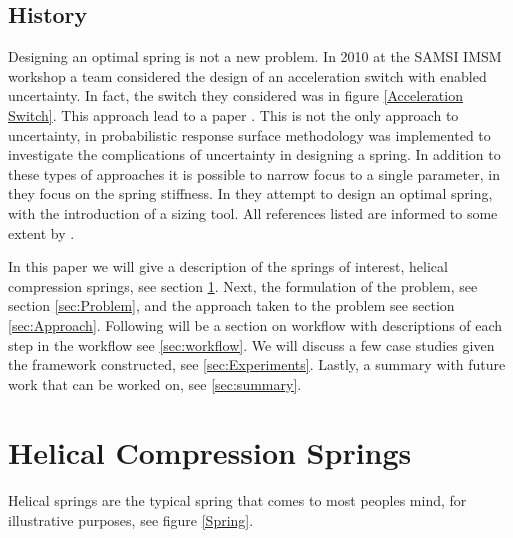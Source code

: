 \documentclass[10pt]{article}
\begin{document}
\subsection{History}
Designing an optimal spring is not a new problem. In 2010 at the SAMSI IMSM workshop a team considered the design of an acceleration switch with enabled uncertainty. In fact, the switch they considered was in figure \ref{Acceleration Switch}. This approach lead to a paper \cite{IMSM2010}. This is not the only approach to uncertainty, in \cite{Reliability} probabilistic response surface methodology was implemented to investigate the complications of uncertainty in designing a spring. In addition to these types of approaches it is possible to narrow focus to a single parameter, in \cite{Robust} they focus on the spring stiffness. In \cite{Paredes} they attempt to design an optimal spring, with the introduction of a sizing tool. All references listed are informed to some extent by \cite{Wahl}. 




In this paper we will give a description of the springs of interest, helical compression springs, see section \ref{sec:Springs}. Next, the formulation of the problem, see section \ref{sec:Problem}, and the approach taken to the problem see section \ref{sec:Approach}. Following will be a section on workflow with descriptions of each step in the workflow see \ref{sec:workflow}. We will discuss a few case studies given the framework constructed, see \ref{sec:Experiments}. Lastly, a summary with future work that can be worked on, see \ref{sec:summary}.





\section{Helical Compression Springs}
\label{sec:Springs}

Helical springs are the typical spring that comes to most peoples mind, for illustrative purposes, see figure \ref{Spring}\cite{Massad2015}. 
\end{document}
